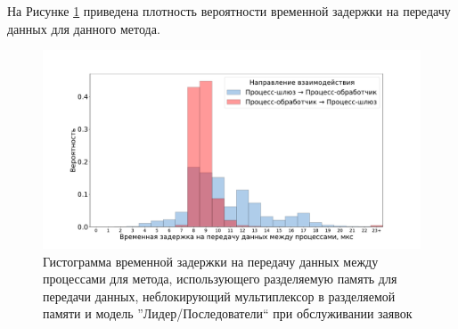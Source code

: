 На Рисунке \ref{chapter41:FigBlockingLF} приведена плотность вероятности временной задержки на передачу данных для данного метода.

\begin{figure}[!h]
\caption{Гистограмма временной задержки на передачу данных между процессами для метода, использующего разделяемую память для передачи данных, неблокирующий мультиплексор в разделяемой памяти и модель ''Лидер/Последователи`` при обслуживании заявок}
\label{chapter41:FigBlockingLF}
\includegraphics[width=\textwidth]{../../graphics/hist/BlockingLF}
\end{figure}
%

